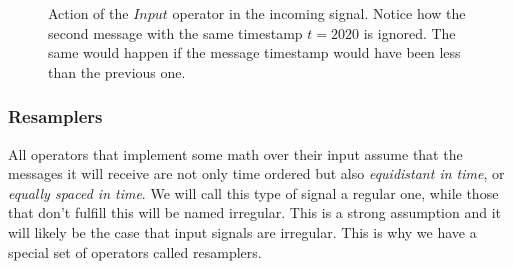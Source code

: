 \documentclass[preprint,1p,times]{elsarticle}
\begin{document}
\begin{figure}
    \label{fig:input operator action}
    \begin{center}
        
    \end{center}
    \caption{Action of the $Input$ operator in the incoming signal. Notice how the second message with the same timestamp $t=2020$ is ignored. The same would happen if the message timestamp would have been less than the previous one.}
\end{figure}


\subsubsection{Resamplers}

All operators that implement some math over their input assume that the messages 
it will receive are not only time ordered but also \textit{equidistant in time}, or \textit{equally
spaced in time}. We will call this type of signal a regular one, while those that
don't fulfill this will be named irregular. This is a strong assumption and it 
will likely be the case that input signals are irregular. This is why we have a
special set of operators called resamplers.
\end{document}
